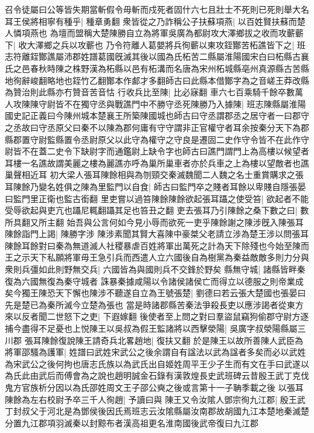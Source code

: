 召令徒屬曰公等皆失期當斬假令毋斬而戍死者固什六七且壯士不死則已死則舉大名耳王侯將相寧有種乎|{
	種章勇翻}
衆皆從之乃詐稱公子扶蘇項燕|{
	以百姓賢扶蘇而楚人憐項燕也}
為壇而盟稱大楚陳勝自立為將軍吳廣為都尉攻大澤鄉拔之收而攻蘄蘄下|{
	收大澤鄉之兵以攻蘄也}
乃令符離人葛嬰將兵徇蘄以東攻銍酇苦柘譙皆下之|{
	班志符離銍酇譙屬沛郡姓譜葛國旣滅其後以國為氏柘苦二縣屬淮陽國宋白曰柘縣古襄氏之邑春秋時陳之株野漢為柘縣以邑有柘溝而名唐為宋州柘城縣亳州真源縣古苦縣地徇辭峻翻略地也銍竹乙翻酇本作䣜才多翻師古曰此縣本借酇字為之音嵯王莽改縣為贊治則此縣亦冇贊音苦音怙}
行收兵比至陳|{
	比必寐翻}
車六七百乘騎千餘卒數萬人攻陳陳守尉皆不在獨守丞與戰譙門中不勝守丞死陳勝乃入據陳|{
	班志陳縣屬淮陽國史記正義曰今陳州城本楚襄王所築陳國城也師古曰守丞謂郡丞之居守者一曰郡守之丞故曰守丞原父曰秦不以陳為郡何庸有守守謂非正官權守者耳余按秦分天下為郡縣郡置守尉監縣置令丞尉原父以此守為權守之守良是遷固二史作守令皆不在此作守尉皆不在蓋二史令下缺尉字而通鑑尉上缺令字也師古曰譙門謂門上為高樓以候望者耳樓一名譙故謂美麗之樓為麗譙亦呼為巢所巢車者亦於兵車之上為樓以望敵者也譙巢聲相近耳}
初大梁人張耳陳餘相與為刎頸交秦滅魏聞二人魏之名士重賞購求之張耳陳餘乃變名姓俱之陳為里監門以自食|{
	師古曰監門卒之賤者耳餘以卑賤自隱張晏曰監門里正衛也監古銜翻}
里吏嘗以過笞陳餘陳餘欲起張耳躡之使受笞|{
	欲起者不能受辱欲起與吏亢也躡尼輒翻躡其足也笞丑之翻}
吏去張耳乃引陳餘之桑下數之曰|{
	數所具翻又所主翻}
始吾與公言何如今見小辱而欲死一吏乎陳餘謝之陳涉旣入陳張耳陳餘詣門上謁|{
	陳勝字涉}
陳涉素聞其賢大喜陳中豪桀父老請立涉為楚王涉以問張耳陳餘耳餘對曰秦為無道滅人社稷暴虐百姓將軍出萬死之計為天下除殘也今始至陳而王之示天下私願將軍毋王急引兵而西遣人立六國後自為樹黨為秦益敵敵多則力分與衆則兵彊如此則野無交兵|{
	六國皆為與國則兵不交鋒於野矣}
縣無守城|{
	諸縣皆畔秦復為六國無復為秦守城者}
誅暴秦據咸陽以令諸侯諸侯亡而得立以德服之則帝業成矣今獨王陳恐天下懈也陳涉不聽遂自立為王號張楚|{
	劉德曰若云張大楚國也張晏曰先是楚已為秦所滅今立楚為張也}
當是時諸郡縣苦秦法爭殺長吏以應涉謁者從東方來以反者聞二世怒下之吏|{
	下遐嫁翻}
後使者至上問之對曰羣盜鼠竊狗偷郡守尉方逐捕今盡得不足憂也上悦陳王以吳叔為假王監諸將以西擊滎陽|{
	吳廣字叔滎陽縣屬三川郡}
張耳陳餘復說陳王請奇兵北畧趙地|{
	復扶又翻}
於是陳王以故所善陳人武臣為將軍邵騷為護軍|{
	姓譜曰武姓宋武公之後余謂自有諡法以武為諡者多矣而必以武姓為宋武公之後何拘也唐志氏族以為武氏出自姬姓周平王少子生而有文在手曰武遂以為氏此由武后而傅會為之說也趙明誠金石錄有漢敦煌長史武班碑云昔殷王武丁克伐鬼方官族析分因以為氏邵姓周文王子邵公奭之後或言第十一子聃季載之後}
以張耳陳餘為左右校尉予卒三千人徇趙|{
	予讀曰與}
陳王又令汝隂人鄧宗徇九江郡|{
	殷王武丁封叔父于河北是為鄧侯後因氏焉班志云汝隂縣屬汝南郡故胡國九江本楚地秦滅楚分置九江郡項羽滅秦以封黥布者漢高祖更名淮南國後武帝復曰九江郡}
